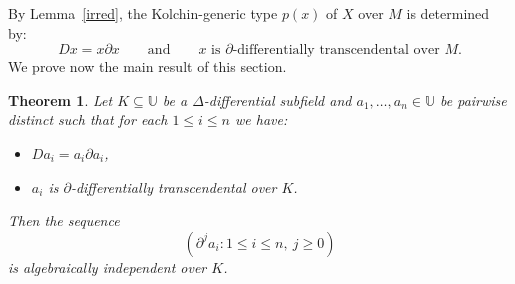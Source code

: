 \documentclass[11pt,a4paper]{amsart}
\newtheorem{theorem}{Theorem}[section]
\theoremstyle{definition}
\newcommand{\Uu}{{\mathds{U}}}
\begin{document}
By Lemma~\ref{irred}, the
Kolchin-generic type $p(x)$ of $X$ over $M$ is determined by:
\[
Dx=x\partial x\qquad \text{and}\qquad \text{$x$ is $\partial$-differentially transcendental over $M$}.
\]
We prove now the main result of this section.
\begin{theorem}\label{independence}
Let $K\subseteq \Uu$ be a $\Delta$-differential subfield and $a_1,\ldots,a_n\in \Uu$ be pairwise distinct such that for each $1\leqslant i\leqslant n$ we have:
\begin{itemize}
  \item $ Da_i=a_i\partial a_i$,
  \item $a_i$ is $\partial$-differentially transcendental over $K$.
\end{itemize}
Then the sequence
\[
 (\partial^j a_i:1\leqslant i\leqslant n,\ j\geqslant0)
\]
is algebraically independent over $K$.
\end{theorem}
\end{document}
